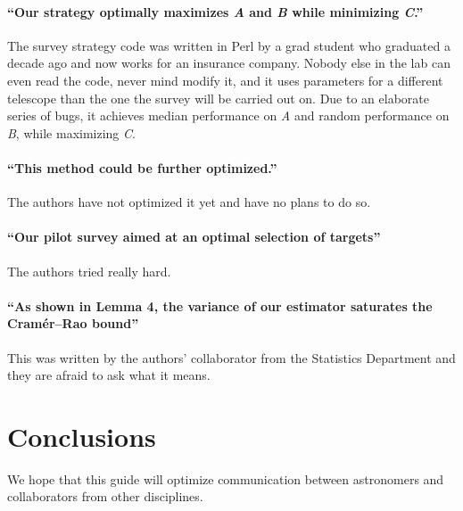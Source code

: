 \documentclass[12pt, preprint]{aastex}
\begin{document}
\paragraph{``Our strategy optimally maximizes \emph{A} and \emph{B} while minimizing \emph{C}.''}
The survey strategy code was written in Perl by a grad student who
graduated a decade ago and now works for an insurance company.  Nobody
else in the lab can even read the code, never mind modify it, and it
uses parameters for a different telescope than the one the survey will
be carried out on.  Due to an elaborate series of bugs, it achieves
median performance on \emph{A} and random performance on \emph{B},
while maximizing \emph{C}.

\paragraph{``This method could be further optimized.''}
The authors have not optimized it yet and have no plans to do so.


\paragraph{``Our pilot survey aimed at an optimal selection of targets''}
The authors tried really hard.

\paragraph{``As shown in Lemma 4, the variance of our estimator saturates
the Cram\'er--Rao bound''}
This was written by the authors' collaborator from the Statistics Department
and they are afraid to ask what it means.


\section{Conclusions}

We hope that this guide will optimize communication between astronomers
and collaborators from other disciplines.
\end{document}
